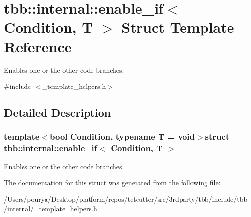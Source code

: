 \hypertarget{structtbb_1_1internal_1_1enable__if}{}\section{tbb\+:\+:internal\+:\+:enable\+\_\+if$<$ Condition, T $>$ Struct Template Reference}
\label{structtbb_1_1internal_1_1enable__if}


Enables one or the other code branches.  




{\ttfamily \#include $<$\+\_\+template\+\_\+helpers.\+h$>$}



\subsection{Detailed Description}
\subsubsection*{template$<$bool Condition, typename T = void$>$struct tbb\+::internal\+::enable\+\_\+if$<$ Condition, T $>$}

Enables one or the other code branches. 

The documentation for this struct was generated from the following file\+:\begin{DoxyCompactItemize}
\item 
/\+Users/pourya/\+Desktop/platform/repos/tetcutter/src/3rdparty/tbb/include/tbb/internal/\+\_\+template\+\_\+helpers.\+h\end{DoxyCompactItemize}
